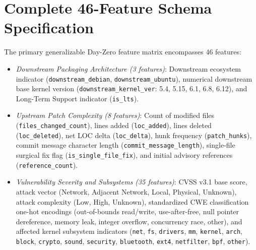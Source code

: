 \documentclass[final,5p,times,twocolumn]{elsarticle}
\begin{document}
\section{Complete 46-Feature Schema Specification}
\label{app:features}
The primary generalizable Day-Zero feature matrix encompasses 46 features:
\begin{itemize}
\item \textit{Downstream Packaging Architecture (3 features)}: Downstream ecosystem indicator (\texttt{downstream\_debian}, \texttt{downstream\_ubuntu}), numerical downstream base kernel version (\texttt{downstream\_kernel\_ver}: 5.4, 5.15, 6.1, 6.8, 6.12), and Long-Term Support indicator (\texttt{is\_lts}).
\item \textit{Upstream Patch Complexity (8 features)}: Count of modified files (\texttt{files\_changed\_count}), lines added (\texttt{loc\_added}), lines deleted (\texttt{loc\_deleted}), net LOC delta (\texttt{loc\_delta}), hunk frequency (\texttt{patch\_hunks}), commit message character length (\texttt{commit\_message\_length}), single-file surgical fix flag (\texttt{is\_single\_file\_fix}), and initial advisory references (\texttt{reference\_count}).
\item \textit{Vulnerability Severity and Subsystems (35 features)}: CVSS v3.1 base score, attack vector (Network, Adjacent Network, Local, Physical, Unknown), attack complexity (Low, High, Unknown), standardized CWE classification one-hot encodings (out-of-bounds read/write, use-after-free, null pointer dereference, memory leak, integer overflow, concurrency race, other), and affected kernel subsystem indicators (\texttt{net}, \texttt{fs}, \texttt{drivers}, \texttt{mm}, \texttt{kernel}, \texttt{arch}, \texttt{block}, \texttt{crypto}, \texttt{sound}, \texttt{security}, \texttt{bluetooth}, \texttt{ext4}, \texttt{netfilter}, \texttt{bpf}, \texttt{other}).
\end{itemize}



\end{document}
